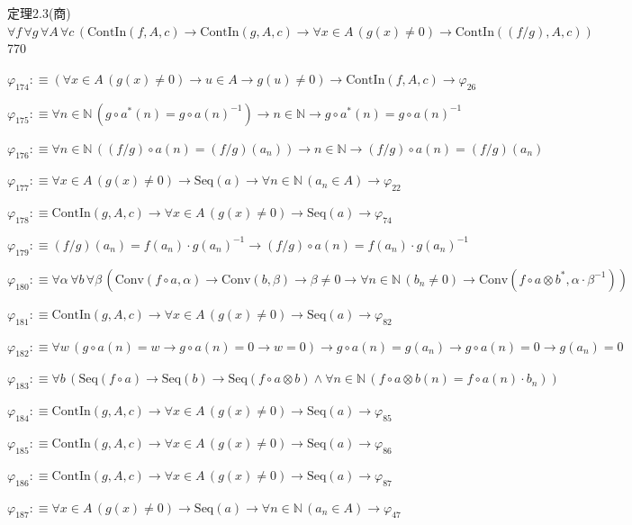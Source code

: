 \begin{fullproof}{定理2.3(商)}{$\forall f\,\forall g\,\forall A\,\forall c\,(\mathrm{ContIn}(f,A,c) \to \mathrm{ContIn}(g,A,c) \to \forall x \in A\,(g(x) \neq 0) \to \mathrm{ContIn}((f / g),A,c))$}{770}
\begin{abbrevlist}
\item $\varphi_{174} :\equiv (\forall x \in A\,(g(x) \neq 0) \to u \in A \to g(u) \neq 0) \to \mathrm{ContIn}(f,A,c) \to \varphi_{26}$
\item $\varphi_{175} :\equiv \forall n \in \mathbb{N}\,(g \circ a^{\ast}(n) = g \circ a(n)^{-1}) \to n \in \mathbb{N} \to g \circ a^{\ast}(n) = g \circ a(n)^{-1}$
\item $\varphi_{176} :\equiv \forall n \in \mathbb{N}\,((f / g) \circ a(n) = (f / g)(a_{n})) \to n \in \mathbb{N} \to (f / g) \circ a(n) = (f / g)(a_{n})$
\item $\varphi_{177} :\equiv \forall x \in A\,(g(x) \neq 0) \to \mathrm{Seq}(a) \to \forall n \in \mathbb{N}\,(a_{n} \in A) \to \varphi_{22}$
\item $\varphi_{178} :\equiv \mathrm{ContIn}(g,A,c) \to \forall x \in A\,(g(x) \neq 0) \to \mathrm{Seq}(a) \to \varphi_{74}$
\item $\varphi_{179} :\equiv (f / g)(a_{n}) = f(a_{n}) \cdot g(a_{n})^{-1} \to (f / g) \circ a(n) = f(a_{n}) \cdot g(a_{n})^{-1}$
\item $\varphi_{180} :\equiv \forall \alpha\,\forall b\,\forall \beta\,(\mathrm{Conv}(f \circ a,\alpha) \to \mathrm{Conv}(b,\beta) \to \beta \neq 0 \to \forall n \in \mathbb{N}\,(b_{n} \neq 0) \to \mathrm{Conv}(f \circ a \otimes b^{\ast},\alpha \cdot \beta^{-1}))$
\item $\varphi_{181} :\equiv \mathrm{ContIn}(g,A,c) \to \forall x \in A\,(g(x) \neq 0) \to \mathrm{Seq}(a) \to \varphi_{82}$
\item $\varphi_{182} :\equiv \forall w\,(g \circ a(n) = w \to g \circ a(n) = 0 \to w = 0) \to g \circ a(n) = g(a_{n}) \to g \circ a(n) = 0 \to g(a_{n}) = 0$
\item $\varphi_{183} :\equiv \forall b\,(\mathrm{Seq}(f \circ a) \to \mathrm{Seq}(b) \to \mathrm{Seq}(f \circ a \otimes b) \land \forall n \in \mathbb{N}\,(f \circ a \otimes b(n) = f \circ a(n) \cdot b_{n}))$
\item $\varphi_{184} :\equiv \mathrm{ContIn}(g,A,c) \to \forall x \in A\,(g(x) \neq 0) \to \mathrm{Seq}(a) \to \varphi_{85}$
\item $\varphi_{185} :\equiv \mathrm{ContIn}(g,A,c) \to \forall x \in A\,(g(x) \neq 0) \to \mathrm{Seq}(a) \to \varphi_{86}$
\item $\varphi_{186} :\equiv \mathrm{ContIn}(g,A,c) \to \forall x \in A\,(g(x) \neq 0) \to \mathrm{Seq}(a) \to \varphi_{87}$
\item $\varphi_{187} :\equiv \forall x \in A\,(g(x) \neq 0) \to \mathrm{Seq}(a) \to \forall n \in \mathbb{N}\,(a_{n} \in A) \to \varphi_{47}$

\end{abbrevlist}
\end{fullproof}
